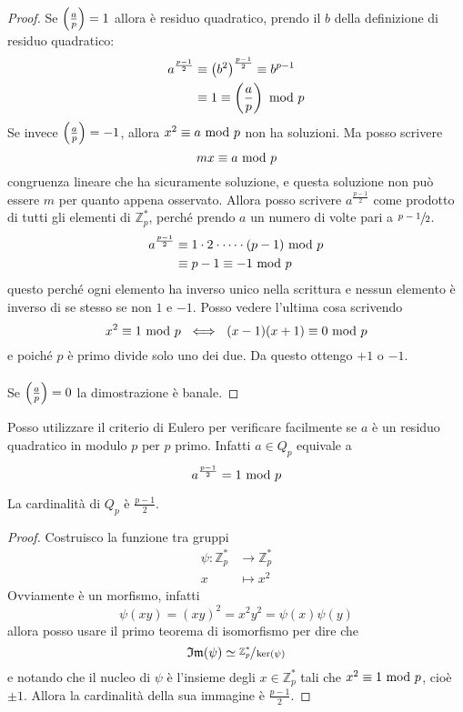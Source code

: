 \begin{proof}
	Se $\left(\frac{a}{p}\right)=1$ allora è residuo quadratico, prendo il $b$ della definizione di residuo quadratico:
	\begin{align*}
	a^{\frac{p-1}{2}}&\equiv \left(b^2\right)^{\frac{p-1}{2}}\equiv b^{p-1}\\ 
	&\equiv 1\equiv\left(\frac{a}{p}\right)\ \mathrm{mod}\ p
	\end{align*}
	Se invece $\left(\frac{a}{p}\right)=-1$, allora $x^2\equiv a\ \mathrm{mod}\ p$ non ha soluzioni. Ma posso scrivere 
	\begin{equation*}
	mx\equiv a\ \mathrm{mod}\ p
	\end{equation*}
	congruenza lineare che ha sicuramente soluzione, e questa soluzione non può essere $m$ per quanto appena osservato. Allora posso scrivere $a^{\frac{p-1}{2}}$ come prodotto di tutti gli elementi di $\mathbb{Z}_p^*$, perché prendo $a$ un numero di volte pari a $\sfrac{p-1}{2}$.
	\begin{align*}
	a^{\frac{p-1}{2}}&\equiv1\cdot2\cdot\dots\cdot(p-1)\ \mathrm{mod}\ p\\
	&\equiv p-1\equiv-1 \ \mathrm{mod}\ p
	\end{align*}
	questo perché ogni elemento ha inverso unico nella scrittura e nessun elemento è inverso di se stesso se non $1$ e $-1$. Posso vedere l'ultima cosa scrivendo 
	\begin{equation*}
	x^2\equiv1\ \mathrm{mod}\ p \ \iff \ (x-1)(x+1)\equiv0\ \mathrm{mod}\ p
	\end{equation*}
	e poiché $p$ è primo divide solo uno dei due. Da questo ottengo $+1$ o $-1$. \\ \\
	Se $\left(\frac{a}{p}\right)=0$ la dimostrazione è banale.
\end{proof}
\begin{osservazione}
	Posso utilizzare il criterio di Eulero per verificare facilmente se $a$ è un residuo quadratico in modulo $p$ per $p$ primo. Infatti $a\in Q_p$ equivale a
	\begin{equation*}
	a^{\frac{p-1}{2}}=1\ \mathrm{mod}\ p
	\end{equation*}
\end{osservazione}
\begin{proposizione}
	La cardinalità di $Q_p$ è $\frac{p-1}{2}$.
\end{proposizione}
\begin{proof}
	Costruisco la funzione tra gruppi
	\begin{align*}
	\psi:\mathbb{Z}_p^*&\longrightarrow\mathbb{Z}_p^*\\
	x&\longmapsto x^2
	\end{align*}
	Ovviamente è un morfismo, infatti 
		\begin{equation*}
		\psi(xy)=(xy)^2=x^2y^2=\psi(x)\psi(y)
		\end{equation*}
		allora posso usare il primo teorema di isomorfismo per dire che 
		\begin{equation*}
		\operatorname{\mathfrak{Im}}(\psi)\simeq\sfrac{\mathbb{Z}_p^*}{\ker(\psi)}
		\end{equation*}
		e notando che il nucleo di $\psi$ è l'insieme degli $x\in\mathbb{Z}_p^*$ tali che $x^2\equiv1\ \mathrm{mod}\ p$, cioè $\pm1$. Allora la cardinalità della sua immagine è $\frac{p-1}{2}$.
\end{proof}
